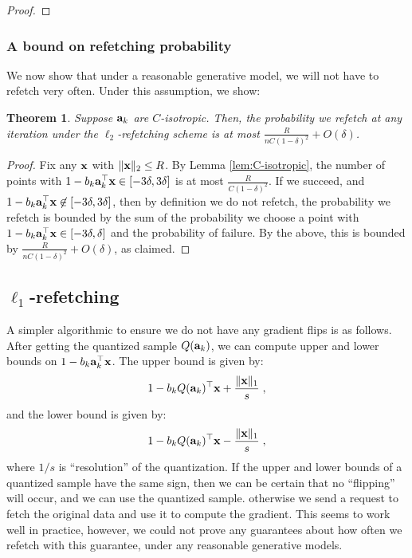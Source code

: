 \documentclass{article}
\def\a{{\bf a}}
\def\g{{\bf g}}
\def\x{{\bf x}}
\def\E{\mathbb{E}}
\newtheorem{theorem}{Theorem}
\begin{document}
\begin{proof}
%
\end{proof}

\subsubsection{A bound on refetching probability}
We now show that under a reasonable generative model, we will not have to refetch very often.
Under this assumption, we show:
\begin{theorem}
Suppose $\a_k$ are $C$-isotropic.
Then, the probability we refetch at any iteration under the $\ell_2$-refetching scheme is at most $\frac{R}{n C(1 - \delta)^2} + O(\delta)$.
\end{theorem}
\begin{proof}
Fix any $\x$ with $\| \x \|_2 \leq R$.
By Lemma \ref{lem:C-isotropic}, the number of points with $1 - b_k \a_k^\top \x \in [-3 \delta, 3\delta]$ is at most $\frac{R}{C(1 - \delta)^2} $.
If we succeed, and $1 - b_k \a_k^\top \x \not\in [-3 \delta, 3\delta]$, then by definition we do not refetch, the probability we refetch is bounded by the sum of the probability we choose a point with $1 - b_k \a_k^\top \x \in [-3 \delta, \delta]$ and the probability of failure.
By the above, this is bounded by $\frac{R}{n C(1 - \delta)^2} + O(\delta)$, as claimed.
\end{proof}

\subsection{$\ell_1$-refetching}
A simpler algorithmic to ensure we do not have any gradient flips is as follows.
After getting the quantized sample $Q(\a_k)$, we can compute  upper and lower bounds on $1 - b_k \a_k^\top \x$. 
The upper bound is given by:
\[1 - b_k Q(\a_k)^\top \x + \frac{\| \x \|_1}{s} \; ,
\]
and the lower bound is given by:
\[1 - b_k Q(\a_k)^\top \x - \frac{\| \x \|_1}{s} \; ,
\]
where $1/s$ is ``resolution'' of the quantization.
If the upper and lower bounds of a quantized sample have the same sign, then we can be certain that  no ``flipping'' will occur, and we can use the quantized sample. otherwise we send a request to fetch the original data and use it to  compute the gradient.
This seems to work well in practice, however, we could not prove any guarantees about how often we refetch with this guarantee, under any reasonable generative models.
\end{document}

